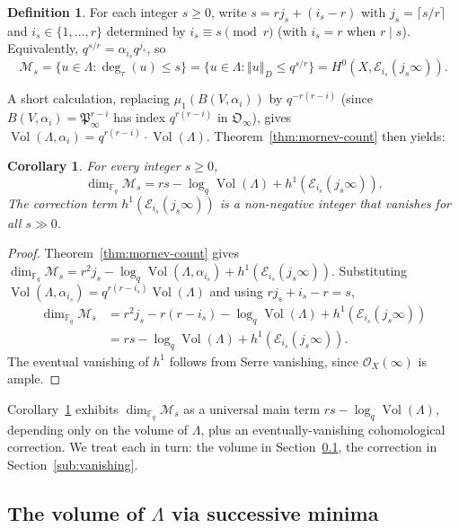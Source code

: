 \documentclass[12pt]{amsart}
\newtheorem{cor}[thm]{Corollary}
\theoremstyle{definition}
\newtheorem{defn}[thm]{Definition}
\theoremstyle{remark}
\numberwithin{equation}{section}
\numberwithin{thm}{section}
\DeclareMathOperator{\Vol}{Vol}
\newcommand{\fO}{\mathfrak{O}}
\newcommand{\fP}{\mathfrak{P}}
\newcommand{\cE}{\mathcal{E}}
\newcommand{\cM}{\mathcal{M}}
\newcommand{\cO}{\mathcal{O}}
\newcommand{\F}{\mathbb{F}}
\newcommand{\La}{\Lambda}
\newcommand{\norm}[1]{\left\Vert#1\right\Vert}
\begin{document}
	\begin{defn}\label{def:js-is}
		For each integer $s \geq 0$, write $s = rj_s + (i_s - r)$ with $j_s = \lceil s/r\rceil$ and $i_s \in \{1, \ldots, r\}$ determined by $i_s \equiv s \pmod r$ (with $i_s = r$ when $r \mid s$). Equivalently, $q^{s/r} = \alpha_{i_s} q^{j_s}$, so
		\[
		\cM_s = \{u \in \La : \deg_\tau(u) \leq s\} = \{u \in \La : \norm{u}_D \leq q^{s/r}\} = H^0(X, \cE_{i_s}(j_s \infty)).
		\]
	\end{defn}
	
	A short calculation, replacing $\mu_1(B(V, \alpha_i))$ by $q^{-r(r-i)}$ (since $B(V, \alpha_i) = \fP_\infty^{r-i}$ has index $q^{r(r-i)}$ in $\fO_\infty$), gives $\Vol(\La, \alpha_i) = q^{r(r-i)}\cdot \Vol(\La)$. Theorem~\ref{thm:mornev-count} then yields:
	
	\begin{cor}\label{cor:dimMs-mornev}
		For every integer $s \geq 0$,
		\begin{equation}\label{eq:dimMs-mornev}
			\dim_{\F_q}\cM_s = rs - \log_q\Vol(\La) + h^1(\cE_{i_s}(j_s\infty)).
		\end{equation}
		The correction term $h^1(\cE_{i_s}(j_s\infty))$ is a non-negative integer that vanishes for all $s \gg 0$.
	\end{cor}
	
	\begin{proof}
		Theorem~\ref{thm:mornev-count} gives $\dim_{\F_q}\cM_s = r^2 j_s - \log_q\Vol(\La, \alpha_{i_s}) + h^1(\cE_{i_s}(j_s\infty))$. Substituting $\Vol(\La, \alpha_{i_s}) = q^{r(r-i_s)}\Vol(\La)$ and using $rj_s + i_s - r = s$,
		\begin{align*}
			\dim_{\F_q}\cM_s &= r^2 j_s - r(r - i_s) - \log_q\Vol(\La) + h^1(\cE_{i_s}(j_s\infty)) \\
			&= rs - \log_q\Vol(\La) + h^1(\cE_{i_s}(j_s\infty)).
		\end{align*}
		The eventual vanishing of $h^1$ follows from Serre vanishing, since $\cO_X(\infty)$ is ample.
	\end{proof}
	
	Corollary~\ref{cor:dimMs-mornev} exhibits $\dim_{\F_q}\cM_s$ as a universal main term $rs - \log_q\Vol(\La)$, depending only on the volume of $\La$, plus an eventually-vanishing cohomological correction. We treat each in turn: the volume in Section~\ref{sub:vol-via-smb}, the correction in Section~\ref{sub:vanishing}.
	
	\subsection{The volume of \texorpdfstring{$\La$}{Lambda} via successive minima}\label{sub:vol-via-smb}
	
\end{document}
